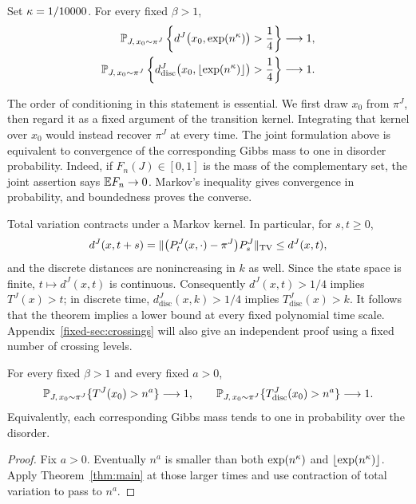 \begin{theorem}\label{thm:main}
Set $\kappa=1/10000$. For every fixed $\beta>1$,
\begin{align*}
 \mathbb P_{J,\,x_0\sim\pi^J}
  \left\{d^J\bigl(x_0,\exp(n^\kappa)\bigr)>\frac14\right\}
  &\longrightarrow1,\\
 \mathbb P_{J,\,x_0\sim\pi^J}
  \left\{d_{\mathrm{disc}}^J
       \bigl(x_0,\lfloor\exp(n^\kappa)\rfloor\bigr)>\frac14\right\}
  &\longrightarrow1.
\end{align*}
\end{theorem}

The order of conditioning in this statement is essential. We first draw
$x_0$ from $\pi^J$, then regard it as a fixed argument of the transition
kernel. Integrating that kernel over $x_0$ would instead recover
$\pi^J$ at every time. The joint formulation above is equivalent to
convergence of the corresponding Gibbs mass to one in disorder
probability. Indeed, if $F_n(J)\in[0,1]$ is the mass of the complementary
set, the joint assertion says $\mathbb E F_n\to0$. Markov's inequality gives
convergence in probability, and boundedness proves the converse.

Total variation contracts under a Markov kernel. In particular, for
$s,t\ge0$,
\[
 d^J(x,t+s)
  =\lVert \bigl(P_t^J(x,\cdot)-\pi^J\bigr)P_s^J\rVert_{\mathrm{TV}}
  \le d^J(x,t),
\]
and the discrete distances are nonincreasing in $k$ as well.
Since the state space is finite, $t\mapsto d^J(x,t)$ is continuous.
Consequently $d^J(x,t)>1/4$ implies $T^J(x)>t$; in discrete time,
$d_{\mathrm{disc}}^J(x,k)>1/4$ implies $T_{\mathrm{disc}}^J(x)>k$.
It follows that the theorem implies a lower bound at every fixed
polynomial time scale. Appendix~\ref{fixed-sec:crossings} will also give
an independent proof using a fixed number of crossing levels.

\begin{corollary}\label{cor:superpolynomial}
For every fixed $\beta>1$ and every fixed $a>0$,
\[
 \mathbb P_{J,\,x_0\sim\pi^J}\{T^J(x_0)>n^a\}\longrightarrow1,
 \qquad
 \mathbb P_{J,\,x_0\sim\pi^J}
       \{T_{\mathrm{disc}}^J(x_0)>n^a\}\longrightarrow1.
\]
Equivalently, each corresponding Gibbs mass tends to one in probability
over the disorder.
\end{corollary}

\begin{proof}
Fix $a>0$. Eventually $n^a$ is smaller than both
$\exp(n^\kappa)$ and $\lfloor\exp(n^\kappa)\rfloor$. Apply
Theorem~\ref{thm:main} at those larger times and use contraction of
total variation to pass to $n^a$.
\end{proof}


